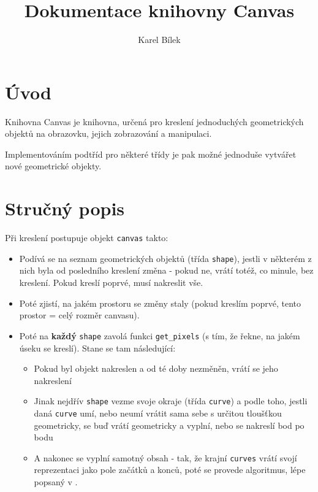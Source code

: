 \documentclass[11pt]{article} %
\begin{document}
    \title{Dokumentace knihovny Canvas}
    \author{Karel Bílek}
    \maketitle

\section{Úvod}
Knihovna Canvas je knihovna, určená pro kreslení jednoduchých geometrických objektů na obrazovku, jejich zobrazování a manipulaci. 

Implementováním podtříd pro některé třídy je pak možné jednoduše vytvářet nové geometrické objekty.

\section{Stručný popis}
Při kreslení postupuje objekt \texttt{canvas} takto:

\begin{itemize}
    \item Podívá se na seznam  geometrických objektů (třída \texttt{shape}), jestli v některém z nich byla od posledního kreslení změna - pokud ne, vrátí totéž, co minule, bez kreslení. Pokud kreslí poprvé, musí nakreslit vše.
    \item Poté zjistí, na jakém prostoru se změny staly (pokud kreslím poprvé, tento prostor = celý rozměr canvasu).
    \item Poté na \textbf{každý} \texttt{shape} zavolá funkci \texttt{get\_pixels} (s tím, že řekne, na jakém úseku se kreslí). Stane se tam následující:
    \begin{itemize}
        \item Pokud byl objekt nakreslen a od té doby nezměněn, vrátí se jeho nakreslení
        \item Jinak nejdřív \texttt{shape} vezme svoje okraje (třída \texttt{curve}) a podle toho, jestli daná \texttt{curve} umí, nebo neumí vrátit sama sebe s určitou tloušťkou geometricky, se buď vrátí geometricky a vyplní, nebo se nakreslí bod po bodu
        \item A nakonec se vyplní samotný obsah - tak, že krajní \texttt{curves} vrátí svojí reprezentaci jako pole začátků a konců, poté se provede algoritmus, lépe popsaný v \cite{Pelikan}.
    \end{itemize}
\end{itemize}
\end{document}
